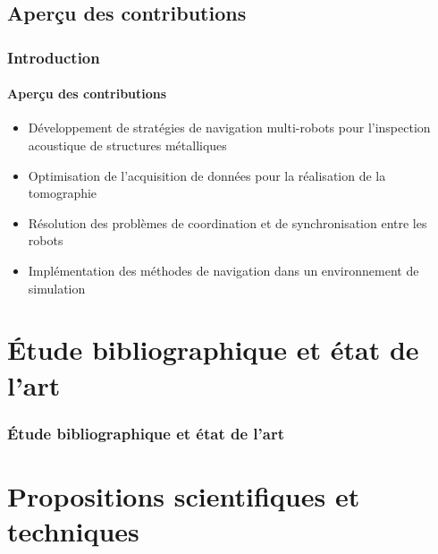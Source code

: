\documentclass{beamer}
\begin{document}
		\subsection*{Aperçu des contributions}
			\begin{frame}
				\frametitle{Introduction}
				\framesubtitle{Aperçu des contributions}
				\begin{itemize}
					\item Développement de stratégies de navigation multi-robots pour l'inspection acoustique de structures métalliques
					\item Optimisation de l'acquisition de données pour la réalisation de la tomographie
					\item Résolution des problèmes de coordination et de synchronisation entre les robots
					\item Implémentation des méthodes de navigation dans un environnement de simulation
				\end{itemize}
			\end{frame}
	\section{Étude bibliographique et état de l'art}
		\begin{frame}
			\frametitle{Étude bibliographique et état de l'art}
			\tiny
			\nocite{9811581, HUTHWAITE2013979, s22093235, article455556, 9568841, 7487624, 7139673}
			
			
		\end{frame}
	\section{Propositions scientifiques et techniques}
\end{document}
